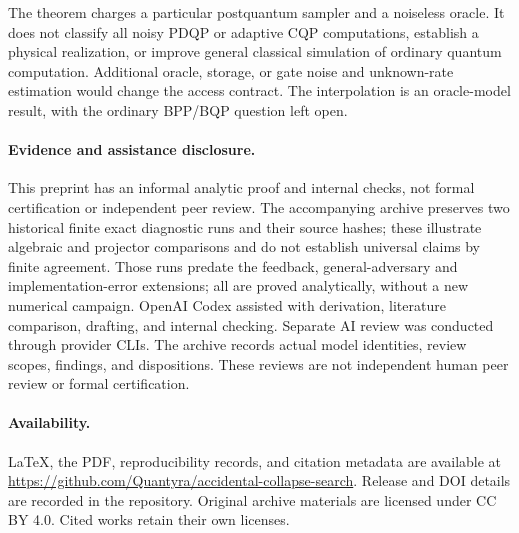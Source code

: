\documentclass[11pt]{article}
\theoremstyle{remark}
\begin{document}
The theorem charges a particular postquantum sampler and a noiseless oracle.
It does not classify all noisy PDQP or adaptive CQP computations, establish
a physical realization, or improve general classical simulation of
ordinary quantum computation. Additional oracle, storage, or gate noise and
unknown-rate estimation would change the access contract. The interpolation
is an oracle-model result, with the ordinary BPP/BQP question left open.

\paragraph{Evidence and assistance disclosure.}
This preprint has an informal analytic proof and internal checks, not formal
certification or independent peer review. The accompanying archive preserves
two historical finite exact diagnostic runs and their source hashes; these illustrate
algebraic and projector comparisons and do not establish universal claims
by finite agreement. Those runs predate the feedback, general-adversary and implementation-error
extensions; all are proved analytically, without a new numerical campaign.
OpenAI Codex assisted with derivation, literature
comparison, drafting, and internal checking. Separate AI review was conducted
through provider CLIs. The archive records actual model identities, review
scopes, findings, and dispositions. These reviews are not independent human
peer review or formal certification.

\paragraph{Availability.}
LaTeX, the PDF, reproducibility records, and citation metadata are available at
\url{https://github.com/Quantyra/accidental-collapse-search}. Release and DOI details are recorded in the repository. Original archive materials are licensed
under CC BY 4.0. Cited works retain their own licenses.
\end{document}
